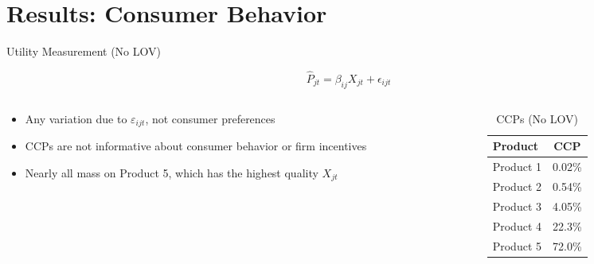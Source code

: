 \documentclass[aspectratio=169,professionalfonts]{beamer}
\begin{document}
\section{Results: Consumer Behavior}

\begin{frame}{Utility Measurement (No LOV)}
  \begin{tcolorbox}[colback=red!5!white, colframe=UGARed, title=\textbf{Utility Function without LOV}]
    \begin{equation*}
      \hat{P}_{jt} = \beta_{ij} X_{jt} + \epsilon_{ijt}
    \end{equation*}
  \end{tcolorbox}
  \begin{columns}[T]
    \begin{column}{0.5\textwidth}
      
      \begin{itemize}
        \item Any variation due to $\varepsilon_{ijt}$, not consumer preferences
        \item CCPs are not informative about consumer behavior or firm incentives
        \item Nearly all mass on Product 5, which has the highest quality $X_{jt}$
      \end{itemize}
    \end{column}
    \begin{column}{0.47\textwidth}
      \begin{table}
        \caption{CCPs (No LOV)}
        \begin{tabular}{lc}
          \toprule
          Product & CCP \\
          \midrule
          Product 1     & 0.02\% \\
          Product 2     & 0.54\% \\
          Product 3     & 4.05\% \\
          Product 4     & 22.3\% \\
          Product 5     & 72.0\% \\
          \bottomrule
        \end{tabular}
      \end{table}
    \end{column}
  \end{columns}
\end{frame}
\end{document}
